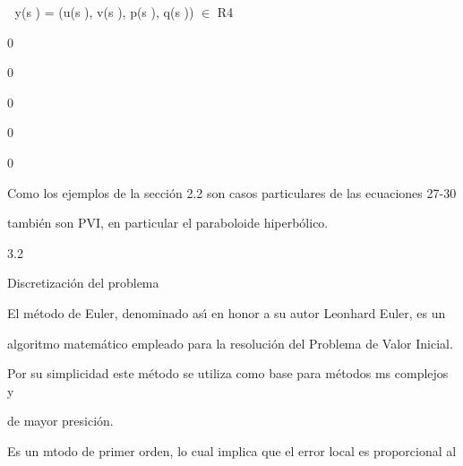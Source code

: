 \documentclass[a4paper,portrait,12pt]{article}
\begin{document}
\begin{flushleft}
 y(s ) = (u(s ), v(s ), p(s ), q(s )) $\in$ R4
\end{flushleft}


0





0





0





0





0





\begin{flushleft}
Como los ejemplos de la sección 2.2 son casos particulares de las ecuaciones 27-30
\end{flushleft}


\begin{flushleft}
también son PVI, en particular el paraboloide hiperbólico.
\end{flushleft}


3.2





\begin{flushleft}
Discretización del problema
\end{flushleft}





\begin{flushleft}
El método de Euler, denominado as\i{}́ en honor a su autor Leonhard Euler, es un
\end{flushleft}


\begin{flushleft}
algoritmo matemático empleado para la resolución del Problema de Valor Inicial.
\end{flushleft}


\begin{flushleft}
Por su simplicidad este método se utiliza como base para métodos ms complejos y
\end{flushleft}


\begin{flushleft}
de mayor presición.
\end{flushleft}


\begin{flushleft}
Es un mtodo de primer orden, lo cual implica que el error local es proporcional al
\end{flushleft}
\end{document}
